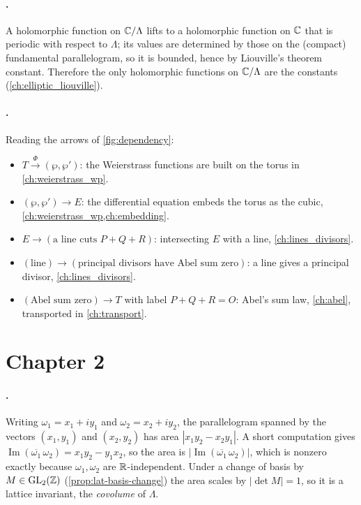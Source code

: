 \paragraph{.}
A holomorphic function on \(\mathbb{C}/\Lambda\) lifts to a holomorphic function on
\(\mathbb{C}\) that is periodic with respect to \(\Lambda\); its values are determined
by those on the (compact) fundamental parallelogram, so it is bounded, hence by
Liouville's theorem constant. Therefore the only holomorphic functions on
\(\mathbb{C}/\Lambda\) are the constants (\cref{ch:elliptic_liouville}).

\paragraph{.}
Reading the arrows of \cref{fig:dependency}:
\begin{itemize}
\item \(T \xrightarrow{\ \Phi\ } (\wp,\wp')\): the Weierstrass functions are
  built on the torus in \cref{ch:weierstrass_wp}.
\item \((\wp,\wp') \to E\): the differential equation embeds the torus as the
  cubic, \cref{ch:weierstrass_wp,ch:embedding}.
\item \(E \to (\text{a line cuts } P+Q+R)\): intersecting \(E\) with a line,
  \cref{ch:lines_divisors}.
\item \((\text{line}) \to (\text{principal divisors have Abel sum zero})\):
  a line gives a principal divisor, \cref{ch:lines_divisors}.
\item \((\text{Abel sum zero}) \to T\) with label \(P+Q+R=O\): Abel's sum law,
  \cref{ch:abel}, transported in \cref{ch:transport}.
\end{itemize}

\section{Chapter 2}
\label{sec:soln-ch2}

\paragraph{.}
Writing \(\omega_1 = x_1 + iy_1\) and \(\omega_2 = x_2 + iy_2\), the
parallelogram spanned by the vectors \((x_1,y_1)\) and \((x_2,y_2)\) has area
\(|x_1 y_2 - x_2 y_1|\). A short computation gives
\(\operatorname{Im}(\overline{\omega_1}\,\omega_2)
= x_1 y_2 - y_1 x_2\), so the area is
\(|\operatorname{Im}(\overline{\omega_1}\,\omega_2)|\), which is nonzero exactly
because \(\omega_1,\omega_2\) are \(\mathbb{R}\)-independent. Under a change of basis by
\(M \in \mathrm{GL}_2(\mathbb{Z})\) (\cref{prop:lat-basis-change}) the area scales by
\(|\det M| = 1\), so it is a lattice invariant, the \emph{covolume} of
\(\Lambda\).

